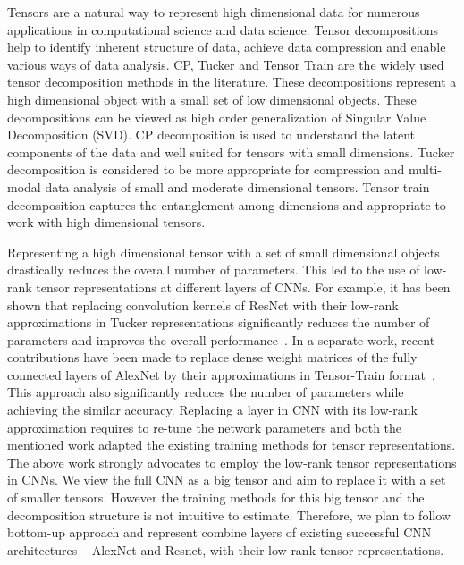 Tensors are a natural way to represent high dimensional data for numerous applications in computational science and data science. Tensor decompositions help to identify inherent structure of data, achieve data compression and enable various ways of data analysis. CP, Tucker and Tensor Train are the widely used tensor decomposition methods in the literature. These decompositions represent a high dimensional object with a small set of low dimensional objects. These decompositions can be viewed as high order generalization of Singular Value Decomposition (SVD). CP decomposition is used to understand the latent components of the data and well suited for tensors with small dimensions. Tucker decomposition is considered to be more appropriate for compression and multi-modal data analysis of small and moderate dimensional tensors. Tensor train decomposition captures the entanglement among dimensions and appropriate to work with high dimensional tensors.


Representing a high dimensional tensor with a set of small dimensional objects drastically reduces the overall number of parameters. This led to the use of low-rank tensor representations at different layers of CNNs. For example, it has been shown that replacing convolution kernels of ResNet with their low-rank approximations in Tucker representations significantly reduces the number of parameters and improves the overall performance~\cite{PSSEG+-ECCV2020}. In a separate work, recent contributions have been made to replace dense weight matrices of the fully connected layers of AlexNet by their approximations in Tensor-Train format~\cite{NPOV-NIPS2015}. This approach also significantly reduces the number of parameters while achieving the similar accuracy. Replacing a layer in CNN with its low-rank approximation requires to re-tune the network parameters and both the mentioned work adapted the existing training methods for tensor representations. The above work strongly advocates to employ the low-rank tensor representations in CNNs. We view the full CNN as a big tensor and aim to replace it with a set of smaller tensors. However the training methods for this big tensor and the decomposition structure is not intuitive to estimate. Therefore, we plan to follow bottom-up approach and represent combine layers of existing successful CNN architectures -- AlexNet and Resnet, with their low-rank tensor representations.






